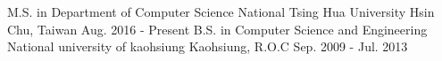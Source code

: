 

\begin{cventries}


  \cventry
  {M.S. in Department of Computer Science} %
    {National Tsing Hua University} %
    {Hsin Chu, Taiwan} %
    {Aug. 2016 - Present} %
    {}
  \cventry
    {B.S. in Computer Science and Engineering} %
    {National university of kaohsiung} %
    {Kaohsiung, R.O.C} %
    {Sep. 2009 - Jul. 2013 } %
    {}
\end{cventries}
